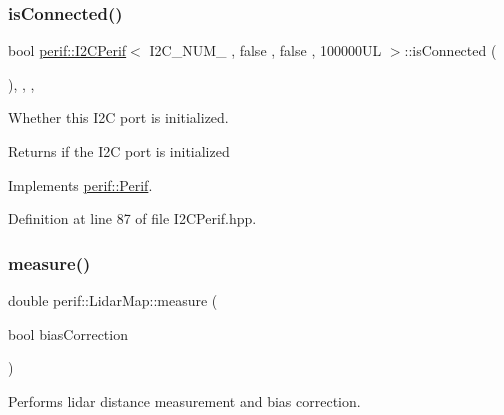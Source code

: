 \subsubsection{\texorpdfstring{isConnected()}{isConnected()}}
{\footnotesize\ttfamily bool \mbox{\hyperlink{classperif_1_1I2CPerif}{perif\+::\+I2\+C\+Perif}}$<$ I2\+C\+\_\+\+N\+U\+M\+\_ , false , false , 100000\+U\+L  $>$\+::is\+Connected (\begin{DoxyParamCaption}{ }\end{DoxyParamCaption})\hspace{0.3cm}{\ttfamily [inline]}, {\ttfamily [override]}, {\ttfamily [virtual]}, {\ttfamily [inherited]}}

Whether this I2C port is initialized.

\begin{DoxyReturn}{Returns}
if the I2C port is initialized 
\end{DoxyReturn}


Implements \mbox{\hyperlink{classperif_1_1Perif_ab9a17fad04e595f3ac0c78b9d3be4c9e}{perif\+::\+Perif}}.



Definition at line 87 of file I2\+C\+Perif.\+hpp.


\begin{DoxyCode}{0}

\end{DoxyCode}
\mbox{\label{classperif_1_1LidarMap_a9a1d5acddce6e370e35219a6edf771cc}} 
\subsubsection{\texorpdfstring{measure()}{measure()}}
{\footnotesize\ttfamily double perif\+::\+Lidar\+Map\+::measure (\begin{DoxyParamCaption}\item[{bool}]{bias\+Correction }\end{DoxyParamCaption})}

Performs lidar distance measurement and bias correction.


